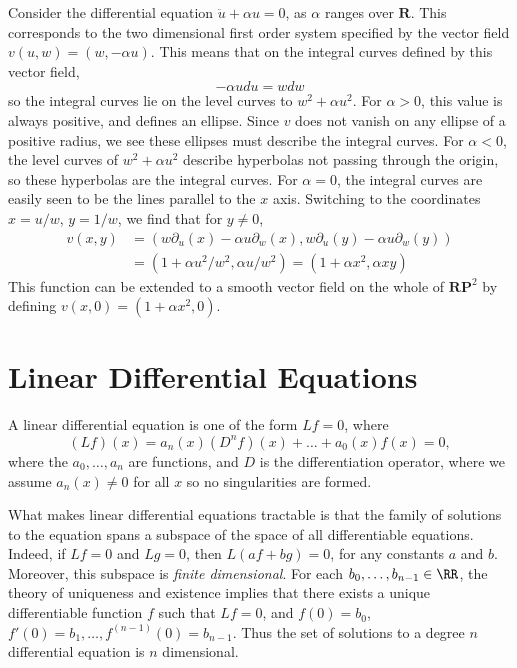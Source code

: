 \begin{example}
    Consider the differential equation $\ddot{u} + \alpha u = 0$, as $\alpha$ ranges over $\mathbf{R}$. This corresponds to the two dimensional first order system specified by the vector field $v(u,w) = (w, -\alpha u)$. This means that on the integral curves defined by this vector field,
    \[ - \alpha u du = w dw \]
    so the integral curves lie on the level curves to $w^2 + \alpha u^2$. For $\alpha > 0$, this value is always positive, and defines an ellipse. Since $v$ does not vanish on any ellipse of a positive radius, we see these ellipses must describe the integral curves. For $\alpha < 0$, the level curves of $w^2 + \alpha u^2$ describe hyperbolas not passing through the origin, so these hyperbolas are the integral curves. For $\alpha = 0$, the integral curves are easily seen to be the lines parallel to the $x$ axis. Switching to the coordinates $x = u/w$, $y = 1/w$, we find that for $y \neq 0$,
    \begin{align*}
        v(x,y) &= (w \partial_u(x) - \alpha u \partial_w(x), w \partial_u(y) - \alpha u \partial_w(y))\\
        &= (1 + \alpha u^2/w^2, \alpha u/w^2) = (1 + \alpha x^2, \alpha xy)
    \end{align*}
    This function can be extended to a smooth vector field on the whole of $\mathbf{RP}^2$ by defining $v(x,0) = (1 + \alpha x^2,0)$.
\end{example}

\chapter{Linear Differential Equations}

A linear differential equation is one of the form $Lf = 0$, where
%
\[ (Lf)(x) = a_n(x) (D^n f)(x) + \dots + a_0(x) f(x) = 0, \]
%
where the $a_0, \dots, a_n$ are functions, and $D$ is the differentiation operator, where we assume $a_n(x) \neq 0$ for all $x$ so no singularities are formed.

What makes linear differential equations tractable is that the family of solutions to the equation spans a subspace of the space of all differentiable equations. Indeed, if $Lf = 0$ and $Lg = 0$, then $L(af + bg) = 0$, for any constants $a$ and $b$. Moreover, this subspace is \emph{finite dimensional}. For each $b_0, \dots, b_{n-1} \in \RR$, the theory of uniqueness and existence implies that there exists a unique differentiable function $f$ such that $Lf = 0$, and $f(0) = b_0$, $f'(0) = b_1, \dots, f^{(n-1)}(0) = b_{n-1}$. Thus the set of solutions to a degree $n$ differential equation is $n$ dimensional.

